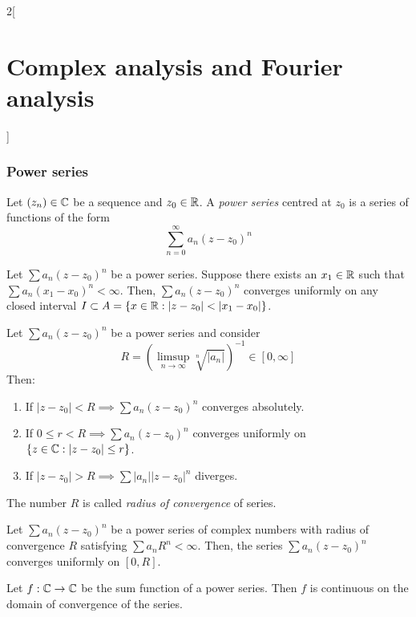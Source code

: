 \documentclass[../../../main.tex]{subfiles}
\begin{document}
\begin{multicols}{2}[\section{Complex analysis and Fourier analysis}]
  \subsubsection{Power series}
  \begin{definition}
    Let $(z_n)\in\mathbb{C}$ be a sequence and $z_0\in\mathbb{R} $. A \emph{power series} centred at $z_0$ is a series of functions of the form $$\sum_{n=0}^\infty a_n{(z-z_0)}^n$$
  \end{definition}
  \begin{prop}
    Let $\sum a_n{(z-z_0)}^n$ be a power series. Suppose there exists an $x_1\in\mathbb{R} $ such that $\sum a_n(x_1-x_0)^n<\infty$. Then, $\sum a_n{(z-z_0)}^n$ converges uniformly on any closed interval $I\subset A=\{x\in\RR :|z-z_0|<|x_1-x_0|\}$.
  \end{prop}
  \begin{theorem}
    Let $\sum a_n{(z-z_0)}^n$ be a power series and consider $$R=\left(\limsup_{n\to\infty}\sqrt[n]{|a_n|}\right)^{-1}\in[0,\infty]$$
    Then:
    \begin{enumerate}
      \item If $|z-z_0|<R\implies\sum a_n{(z-z_0)}^n$ converges absolutely.
      \item If $0\leq r<R\implies\sum a_n{(z-z_0)}^n$ converges uniformly on $\{z\in\mathbb{C}:|z-z_0|\leq r\}$.
      \item If $|z-z_0|>R\implies\sum|a_n|{|z-z_0|}^n$ diverges.
    \end{enumerate}
    The number $R$ is called \emph{radius of convergence} of series.
  \end{theorem}
  \begin{theorem}
    Let $\sum a_n{(z-z_0)}^n$ be a power series of complex numbers with radius of convergence $R$ satisfying $\sum a_nR^n<\infty$. Then, the series $\sum a_n{(z-z_0)}^n$ converges uniformly on $[0,R]$.
  \end{theorem}
  \begin{prop}
    Let $f:\mathbb{C}\rightarrow\mathbb{C}$ be the sum function of a power series. Then $f$ is continuous on the domain of convergence of the series.
  \end{prop}

\end{multicols}
\end{document}
